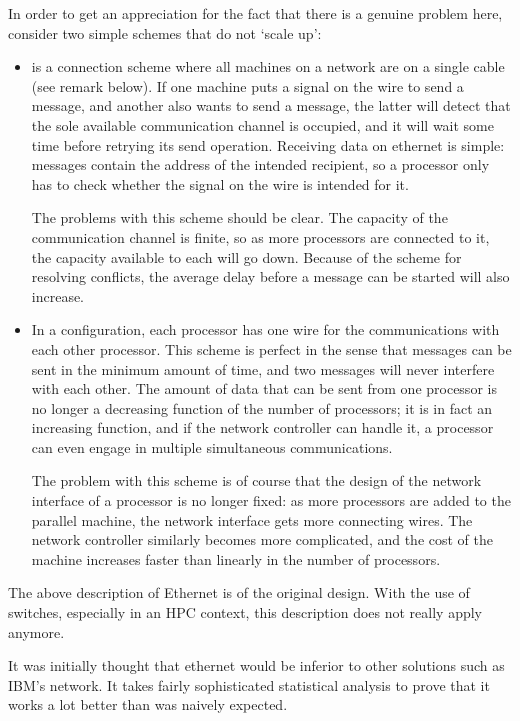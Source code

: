 In order to get an appreciation for the fact that there is a genuine
problem here, consider two
simple schemes that do not `scale up':
\begin{itemize}
\item {} is a connection scheme where all machines on a network
  are on a single cable (see remark below).
  If one
  machine puts a signal on the wire to send a message, and another
  also wants to send a message, the latter will detect that the sole
  available communication channel is occupied, and it will wait some
  time before retrying its send operation. Receiving data on ethernet
  is simple: messages contain the address of the intended recipient,
  so a processor only has to check whether the signal on the wire is
  intended for it.

  The problems with this scheme should be clear. The capacity of the
  communication channel is finite, so as more processors are connected
  to it, the capacity available to each will go down. Because of the
  scheme for resolving conflicts, the average delay before a message
  can be started will also increase.
\item In a  configuration,
  each processor has one wire for
  the communications with each other processor. This scheme is perfect
  in the sense that messages can be sent in the minimum amount of time,
  and two messages will never interfere with each other.
  The amount of data that can be sent from one
  processor is no longer a decreasing function of the number of
  processors; it is in fact an increasing function, and if the
  network controller can handle it, a processor can even engage in
  multiple simultaneous communications.

  The problem with this scheme is of course that the design of the
  network interface of a processor 
  is no longer fixed: as more processors are added
  to the parallel machine, the network interface gets more
  connecting wires. The network controller similarly becomes 
  more complicated, and the cost of the machine increases faster than
  linearly in the number of processors.
\end{itemize}

\begin{remark}
The above description of Ethernet is of the original design. With the
use of switches, especially in an HPC context, this description does
not really apply anymore.

It was initially thought that ethernet would be inferior to other
solutions such as IBM's  network. It
takes fairly sophisticated statistical analysis to prove that it works
a lot better than was naively expected.
\end{remark}

